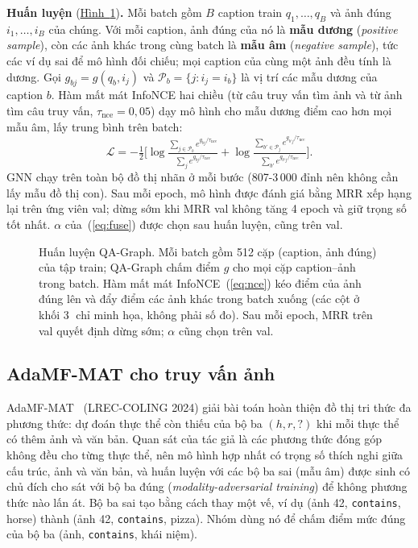 \documentclass[conference]{IEEEtran}
\begin{document}
\textbf{Huấn luyện} (\hyperref[fig:train]{Hình~\ref*{fig:train}})\textbf{.} Mỗi batch gồm $B$ caption train $q_1,\dots,q_B$ và ảnh đúng $i_1,\dots,i_B$ của chúng. Với mỗi caption, ảnh đúng của nó là \textbf{mẫu dương} (\emph{positive sample}), còn các ảnh khác trong cùng batch là \textbf{mẫu âm} (\emph{negative sample}), tức các ví dụ sai để mô hình đối chiếu; mọi caption của cùng một ảnh đều tính là dương. Gọi $g_{bj}=g(q_b,i_j)$ và $\mathcal P_b=\{j: i_j=i_b\}$ là vị trí các mẫu dương của caption $b$. Hàm mất mát InfoNCE hai chiều (từ câu truy vấn tìm ảnh và từ ảnh tìm câu truy vấn, $\tau_{\text{nce}}=0{,}05$) dạy mô hình cho mẫu dương điểm cao hơn mọi mẫu âm, lấy trung bình trên batch:
\begin{equation}\label{eq:nce}
\mathcal L=-\tfrac12\Big[\log\tfrac{\sum_{j\in\mathcal P_b}e^{g_{bj}/\tau_{\text{nce}}}}{\sum_{j}e^{g_{bj}/\tau_{\text{nce}}}}+\log\tfrac{\sum_{b'\in\mathcal P_j}e^{g_{b'j}/\tau_{\text{nce}}}}{\sum_{b'}e^{g_{b'j}/\tau_{\text{nce}}}}\Big].
\end{equation}
GNN chạy trên toàn bộ đồ thị nhãn ở mỗi bước (807-3\,000 đỉnh nên không cần lấy mẫu đồ thị con). Sau mỗi epoch, mô hình được đánh giá bằng MRR xếp hạng lại trên ứng viên val; dừng sớm khi MRR val không tăng 4 epoch và giữ trọng số tốt nhất. $\alpha$ của~(\ref{eq:fuse}) được chọn sau huấn luyện, cũng trên val.

\begin{figure}[t]
\centering

\caption{Huấn luyện QA-Graph. Mỗi batch gồm 512 cặp (caption, ảnh đúng) của tập train; QA-Graph chấm điểm $g$ cho mọi cặp caption--ảnh trong batch. Hàm mất mát InfoNCE~(\ref{eq:nce}) kéo điểm của ảnh đúng lên và đẩy điểm các ảnh khác trong batch xuống (các cột ở khối \textcircled{\scriptsize 3} chỉ minh họa, không phải số đo). Sau mỗi epoch, MRR trên val quyết định dừng sớm; $\alpha$ cũng chọn trên val.}\label{fig:train}
\end{figure}

\subsection{AdaMF-MAT cho truy vấn ảnh}\label{sec:m-adamf}
AdaMF-MAT~\cite{adamf} (LREC-COLING 2024) giải bài toán hoàn thiện đồ thị tri thức đa phương thức: dự đoán thực thể còn thiếu của bộ ba $(h,r,?)$ khi mỗi thực thể có thêm ảnh và văn bản. Quan sát của tác giả là các phương thức đóng góp không đều cho từng thực thể, nên mô hình hợp nhất có trọng số thích nghi giữa cấu trúc, ảnh và văn bản, và huấn luyện với các bộ ba sai (mẫu âm) được sinh có chủ đích cho sát với bộ ba đúng (\emph{modality-adversarial training}) để không phương thức nào lấn át. Bộ ba sai tạo bằng cách thay một vế, ví dụ (ảnh 42, \texttt{contains}, horse) thành (ảnh 42, \texttt{contains}, pizza). Nhóm dùng nó để chấm điểm mức đúng của bộ ba (ảnh, \texttt{contains}, khái niệm).
\end{document}
